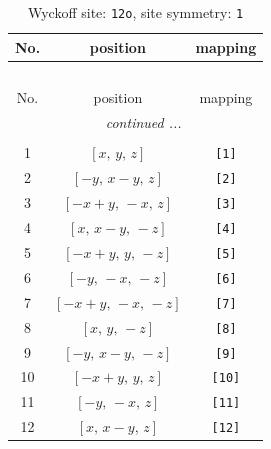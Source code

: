 \documentclass[fleqn,8pt]{jsarticle}
\begin{document}
\renewcommand{\arraystretch}{1.2}
\begin{longtable}{ccc}
\caption{Wyckoff site: {\tt 12o}, site symmetry: {\tt 1}}
 \\
 \hline \hline
No. & position & mapping \\ \hline \endfirsthead

\multicolumn{2}{l}{\tablename\ \thetable{}} \\
 \hline \hline
No. & position & mapping \\ \hline \endhead

 \hline \hline
\multicolumn{2}{r}{\footnotesize\it continued ...} \\ \endfoot

 \hline \hline
\multicolumn{2}{r}{} \\ \endlastfoot

1 & $\left[ x,\, y,\, z \right]$ & {\tt [1]} \\ \hline
2 & $\left[ - y,\, x - y,\, z \right]$ & {\tt [2]} \\ \hline
3 & $\left[ - x + y,\, - x,\, z \right]$ & {\tt [3]} \\ \hline
4 & $\left[ x,\, x - y,\, - z \right]$ & {\tt [4]} \\ \hline
5 & $\left[ - x + y,\, y,\, - z \right]$ & {\tt [5]} \\ \hline
6 & $\left[ - y,\, - x,\, - z \right]$ & {\tt [6]} \\ \hline
7 & $\left[ - x + y,\, - x,\, - z \right]$ & {\tt [7]} \\ \hline
8 & $\left[ x,\, y,\, - z \right]$ & {\tt [8]} \\ \hline
9 & $\left[ - y,\, x - y,\, - z \right]$ & {\tt [9]} \\ \hline
10 & $\left[ - x + y,\, y,\, z \right]$ & {\tt [10]} \\ \hline
11 & $\left[ - y,\, - x,\, z \right]$ & {\tt [11]} \\ \hline
12 & $\left[ x,\, x - y,\, z \right]$ & {\tt [12]} \\
\end{longtable}
\end{document}
